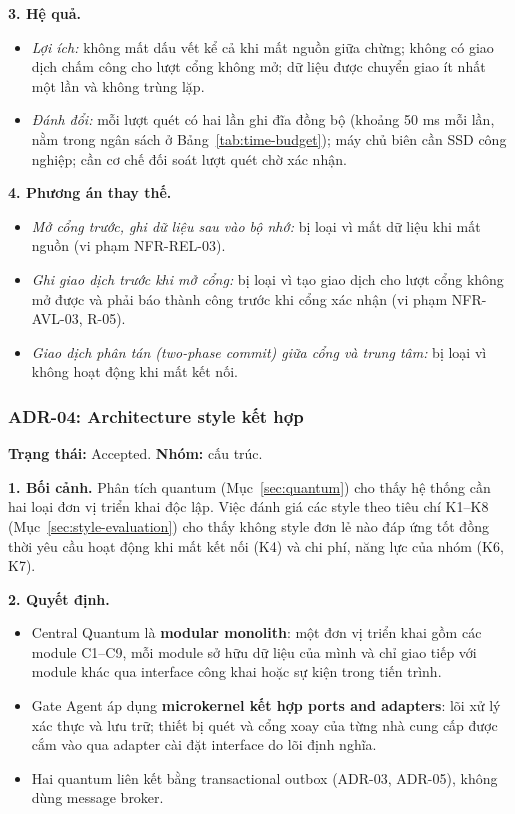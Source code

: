 \noindent\textbf{3. Hệ quả.}
\begin{itemize}
    \item \textit{Lợi ích:} không mất dấu vết kể cả khi mất nguồn giữa chừng; không có giao dịch chấm công cho lượt cổng không mở; dữ liệu được chuyển giao ít nhất một lần và không trùng lặp.
    \item \textit{Đánh đổi:} mỗi lượt quét có hai lần ghi đĩa đồng bộ (khoảng 50 ms mỗi lần, nằm trong ngân sách ở Bảng~\ref{tab:time-budget}); máy chủ biên cần SSD công nghiệp; cần cơ chế đối soát lượt quét chờ xác nhận.
\end{itemize}

\noindent\textbf{4. Phương án thay thế.}
\begin{itemize}
    \item \textit{Mở cổng trước, ghi dữ liệu sau vào bộ nhớ:} bị loại vì mất dữ liệu khi mất nguồn (vi phạm NFR-REL-03).
    \item \textit{Ghi giao dịch trước khi mở cổng:} bị loại vì tạo giao dịch cho lượt cổng không mở được và phải báo thành công trước khi cổng xác nhận (vi phạm NFR-AVL-03, R-05).
    \item \textit{Giao dịch phân tán (two-phase commit) giữa cổng và trung tâm:} bị loại vì không hoạt động khi mất kết nối.
\end{itemize}

\subsubsection{ADR-04: Architecture style kết hợp}\label{adr:04}
\textbf{Trạng thái:} Accepted. \textbf{Nhóm:} cấu trúc.

\noindent\textbf{1. Bối cảnh.} Phân tích quantum (Mục~\ref{sec:quantum}) cho thấy hệ thống cần hai loại đơn vị triển khai độc lập. Việc đánh giá các style theo tiêu chí K1--K8 (Mục~\ref{sec:style-evaluation}) cho thấy không style đơn lẻ nào đáp ứng tốt đồng thời yêu cầu hoạt động khi mất kết nối (K4) và chi phí, năng lực của nhóm (K6, K7).

\noindent\textbf{2. Quyết định.}
\begin{itemize}
    \item Central Quantum là \textbf{modular monolith}: một đơn vị triển khai gồm các module C1--C9, mỗi module sở hữu dữ liệu của mình và chỉ giao tiếp với module khác qua interface công khai hoặc sự kiện trong tiến trình.
    \item Gate Agent áp dụng \textbf{microkernel kết hợp ports and adapters}: lõi xử lý xác thực và lưu trữ; thiết bị quét và cổng xoay của từng nhà cung cấp được cắm vào qua adapter cài đặt interface do lõi định nghĩa.
    \item Hai quantum liên kết bằng transactional outbox (ADR-03, ADR-05), không dùng message broker.
\end{itemize}

